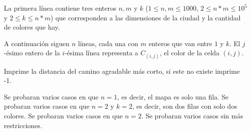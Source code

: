 \documentclass{oci}
\begin{document}
\begin{inputDescription}
La primera línea contiene tres enteros $n, m$ y $k$ ($1 \leq n, m \leq 1000$, $2 \leq n*m \leq 10^5$ y $2 \leq k \leq n*m$) que corresponden a las dimensiones de la ciudad y la cantidad de colores que hay.

A continuación siguen $n$ líneas, cada una con $m$ enteros que van entre $1$ y $k$. El $j$-ésimo entero de la $i$-ésima línea representa a $C_{(i,j)}$, el color de la celda $(i,j)$.

\end{inputDescription}

\begin{outputDescription}
Imprime la distancia del camino agradable más corto, si este no existe imprime -1.

\end{outputDescription}

\begin{scoreDescription}
  Se probaran varios casos en que $n = 1$, es decir, el mapa es solo una fila.
  Se probaran varios casos en que $n = 2$ y $k = 2$, es decir, son dos filas con solo dos colores.
  Se probaran varios casos en que $n = 2$.
  Se probaran varios casos sin más restricciones.
\end{scoreDescription}

\begin{sampleDescription}
\end{sampleDescription}
\end{document}
